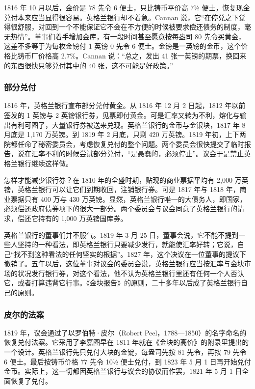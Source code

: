 1816 年 10 月以后，金价是 78 先令 6 便士，只比铸币平价高 7½ 便士，恢复现金兑付本来应当显得很容易\cite{cannan1919}。英格兰银行却不着急。Cannan 说，它“在停兑之下觉得很舒服，对回到一个不能保证它不会在不方便的时候被要求偿还债务的制度，毫无热情”\cite{cannan1919}。董事们着手增加金库，有一段时间甚至愿意按每盎司 80 先令买黄金，这差不多等于为每枚金镑付 1 英镑 0 先令 6 便士\cite{cannan1919}。金镑是一英镑的金币，这个价格比铸币厂价格高 2.7\%。Cannan 说：“总之，发出 41 张一英镑的期票，换回来的东西很快只够兑付其中的 40 张，这不可能是好政策。”\cite{cannan1919}

\subsubsection{部分兑付}
1816 年，英格兰银行宣布部分兑付黄金。从 1816 年 12 月 2 日起，1812 年以前签发的 1 英镑与 2 英镑银行券，见票即付黄金\cite{cannan1919}。可是汇率又转为不利，熔化与输出有利可图了，大量银行券被送来兑现\cite{cannan1919}。英格兰银行的金币与金银块，1817 年 8 月底是 1,170 万英镑。到 1819 年 2 月底，只剩 420 万英镑\cite{cannan1919}。1819 年初，上下两院都任命了秘密委员会，考虑恢复兑付的整个问题。两个委员会很快提交了临时报告，说在汇率不利的时候尝试部分兑付，“是愚蠢的，必须停止”。议会于是禁止英格兰银行继续这样做\cite{cannan1919}。

怎样才能减少银行券？在 1810 年的全盛时期，贴现的商业票据平均有 2,000 万英镑，英格兰银行可以让它们到期收回，注销银行券。可是 1817 年与 1818 年，商业票据只有 400 万与 430 万英镑\cite{cannan1919}。显然，英格兰银行唯一的大债务人，即国家，必须偿还政府债券项下的很大一部分。两个委员会与议会同意了英格兰银行的请求，偿还它持有的 1,000 万英镑国库券\cite{cannan1919}。

英格兰银行的董事们并不服气。1819 年 3 月 25 日，董事会说，它不能不提到一些人坚持的一种看法，即英格兰银行只要减少发行，就能使汇率好转；它说，自己“找不到这种看法的任何坚实的根据”\cite{cannan1919}。1827 年，这个决议在一位董事的提议下撤销了。五年以后，这位董事对议会的委员会说，英格兰银行应当按汇率与金块市场的状况发行银行券，对这个看法，他不认为英格兰银行里还有任何一个人否认它，或者打算违背它行事\cite{cannan1919}。《金块报告》的原则，二十多年以后成了英格兰银行自己的原则。

\subsubsection{皮尔的法案}
1819 年，议会通过了以罗伯特·皮尔（Robert Peel，1788—1850）的名字命名的恢复兑付法案。它采用了李嘉图早在 1811 年就在《金块的高价》的附录里提出的一个设计\cite{cannan1919}。英格兰银行先只兑付大块的金锭，每盎司先按 81 先令，再按 79 先令 6 便士。最后按铸币价格 77 先令 10½ 便士兑付，到 1823 年 5 月 1 日再开始兑付金币。实际上，这一切都因英格兰银行与议会的协议而作罢，1821 年 5 月 1 日全面恢复了兑付\cite{cannan1919}。

